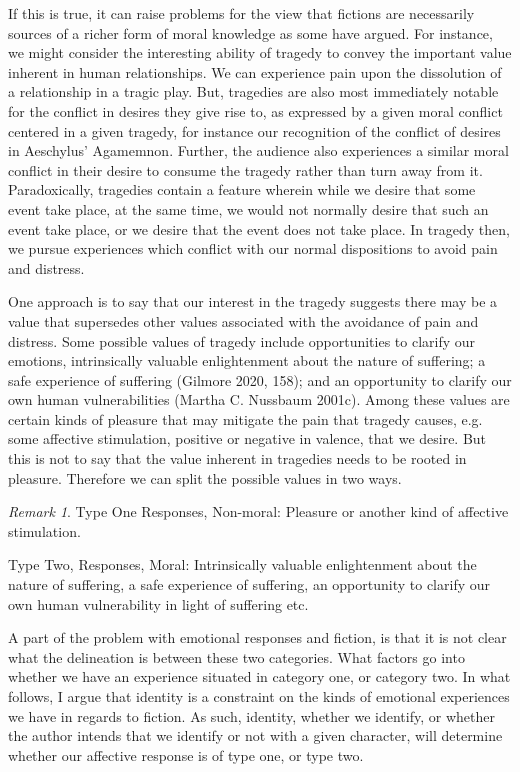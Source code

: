 \documentclass[12pt]{book}
\theoremstyle{definition}
\theoremstyle{remark}
\newtheorem{remark}[theorem]{Remark}
\begin{document}
If this is true, it can raise problems for the view that fictions are necessarily sources of a richer form of moral knowledge as some have argued. For instance, we might consider the interesting ability of tragedy to convey the important value inherent in human relationships. We can experience pain upon the dissolution of a relationship in a tragic play. But, tragedies are also most immediately notable for the conflict in desires they give rise to, as expressed by a given moral conflict centered in a given tragedy, for instance our recognition of the conflict of desires in Aeschylus' Agamemnon. Further, the audience also experiences a similar moral conflict in their desire to consume the tragedy rather than turn away from it. Paradoxically, tragedies contain a feature wherein while we desire that some event take place, at the same time, we would not normally desire that such an event take place, or we desire that the event does not take place. In tragedy then, we pursue experiences which conflict with our normal dispositions to avoid pain and distress.

One approach is to say that our interest in the tragedy suggests there may be a value that supersedes other values associated with the avoidance of pain and distress. Some possible values of tragedy include opportunities to clarify our emotions, intrinsically valuable enlightenment about the nature of suffering; a safe experience of suffering (Gilmore 2020, 158); and an opportunity to clarify our own human vulnerabilities (Martha C. Nussbaum 2001c). Among these values are certain kinds of pleasure that may mitigate the pain that tragedy causes, e.g.\,some affective stimulation, positive or negative in valence, that we desire. But this is not to say that the value inherent in tragedies needs to be rooted in pleasure. Therefore we can split the possible values in two ways.

\begin{remark}
Type One Responses, Non-moral: Pleasure or another kind of affective stimulation.

Type Two, Responses, Moral: Intrinsically valuable enlightenment about the nature of suffering, a safe experience of suffering, an opportunity to clarify our own human vulnerability in light of suffering etc.
\end{remark}

A part of the problem with emotional responses and fiction, is that it is not clear what the delineation is between these two categories. What factors go into whether we have an experience situated in category one, or category two. In what follows, I argue that identity is a constraint on the kinds of emotional experiences we have in regards to fiction. As such, identity, whether we identify, or whether the author intends that we identify or not with a given character, will determine whether our affective response is of type one, or type two.
\end{document}
